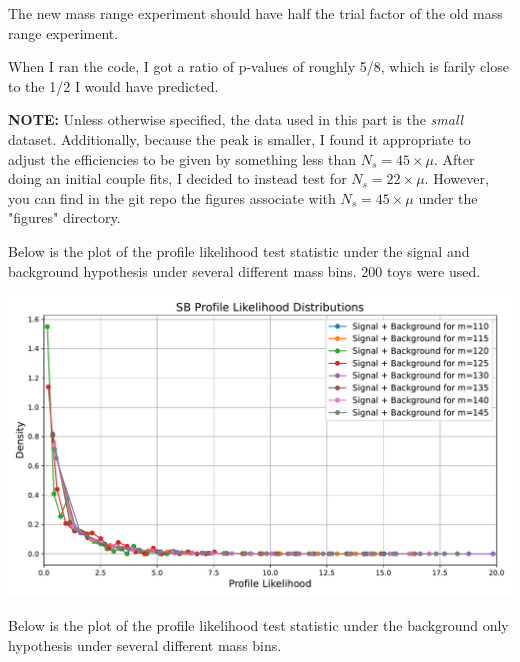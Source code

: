 \documentclass{6042}
\begin{document}

The new mass range experiment should have half the trial factor of the old mass range experiment. 

When I ran the code, I got a ratio of p-values of roughly 5/8, which is farily close to the 1/2 I would have predicted. 





\textbf{NOTE:} Unless otherwise specified, the data used in this part is the \textit{small} dataset. Additionally, because the peak is smaller, I found it appropriate to adjust the efficiencies to be given by something less than $N_s = 45 \times \mu$. After doing an initial couple fits, I decided to instead test for $N_s = 22 \times \mu$. However, you can find in the git repo the figures associate with $N_s = 45 \times \mu$ under the "figures" directory.


Below is the plot of the profile likelihood test statistic under the signal and background hypothesis under several different mass bins. 200 toys were used. 

\begin{center}
    \includegraphics[scale=0.5]{images/cls_small_nsig22/cls_sb_profile_likelihoods_mass_binned.pdf}
\end{center}


Below is the plot of the profile likelihood test statistic under the background only hypothesis under several different mass bins. 
\end{document}
